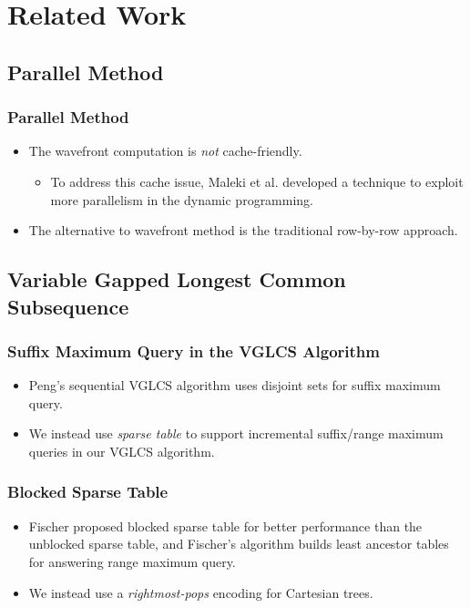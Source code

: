 \section{Related Work}

\subsection{Parallel Method}
\begin{frame}
	\frametitle{Parallel Method}
	\begin{itemize}
		\setlength\itemsep{1em}
		\item
			The wavefront computation is {\em not} cache-friendly.
			\begin{itemize}
				\item 
					To address this cache issue, Maleki et al. developed
					a technique to exploit more parallelism in the
					dynamic programming.
			\end{itemize}
		\item
			The alternative to wavefront method is the traditional
			row-by-row approach.
	\end{itemize}
\end{frame}

\subsection{Variable Gapped Longest Common Subsequence}
\begin{frame}
	\frametitle{Suffix Maximum Query in the VGLCS Algorithm}
	\begin{itemize}
		\setlength\itemsep{1em}
		\item
			Peng's sequential VGLCS algorithm uses disjoint sets for
			suffix maximum query. 
		\item
			We instead use {\em sparse table} to support incremental
			suffix/range maximum queries in our VGLCS algorithm.
	\end{itemize}
\end{frame}

\begin{frame}
	\frametitle{Blocked Sparse Table}
	\begin{itemize}
		\setlength\itemsep{1em}
		\item
			Fischer proposed blocked sparse table for better performance
			than the unblocked sparse table, and Fischer's algorithm
			builds least ancestor tables for answering range maximum
			query.
		\item
			We instead use a {\em rightmost-pops} encoding for Cartesian
			trees.
	\end{itemize}
\end{frame}

